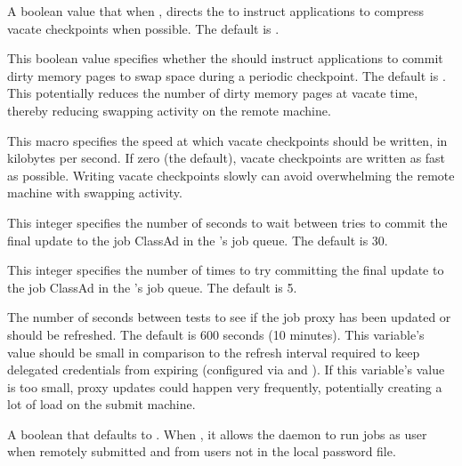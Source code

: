 \begin{description}
\label{param:CompressVacateCkpt}
\item[\Macro{COMPRESS\_VACATE\_CKPT}]
  A boolean value that when , directs the 
  to instruct applications to compress vacate checkpoints when possible.
  The default is .

\label{param:PeriodicMemorySync}
\item[\Macro{PERIODIC\_MEMORY\_SYNC}]
  This boolean value specifies whether the  should instruct
  applications to commit dirty memory pages to swap space during a
  periodic checkpoint.  The default is .  This potentially
  reduces the number of dirty memory pages at vacate time, thereby
  reducing swapping activity on the remote machine.

\label{param:SlowCkptSpeed}
\item[\Macro{SLOW\_CKPT\_SPEED}]
  This macro specifies the speed at which vacate checkpoints should be
  written, in kilobytes per second.  If zero (the default), vacate
  checkpoints are written as fast as possible.  Writing vacate
  checkpoints slowly can avoid overwhelming the remote machine with
  swapping activity.

\label{param:ShadowJobCleanupRetryDelay}
\item[\Macro{SHADOW\_JOB\_CLEANUP\_RETRY\_DELAY}]
  This integer specifies the number of seconds to wait between tries
  to commit the final update to the job ClassAd in the 's
  job queue.  The default is 30.

\label{param:ShadowMaxJobCleanupRetries}
\item[\Macro{SHADOW\_MAX\_JOB\_CLEANUP\_RETRIES}]
  This integer specifies the number of times to try committing
  the final update to the job ClassAd in the 's
  job queue.  The default is 5.

\label{param:ShadowCheckproxyInterval}
\item[\Macro{SHADOW\_CHECKPROXY\_INTERVAL}]
  The number of seconds between tests to see if the job proxy has been
  updated or should be refreshed.  The default is 600 seconds (10 minutes).
  This variable's value should be small in comparison to the refresh interval
  required to keep delegated credentials from expiring 
  (configured via
   and
  ).  
  If this variable's value is too small, 
  proxy updates could happen very frequently, 
  potentially creating a lot of load on the submit machine.

\label{param:ShadowRunUnknownUserJobs}
\item[\Macro{SHADOW\_RUN\_UNKNOWN\_USER\_JOBS}]
  A boolean that defaults to .
  When , it allows the  daemon to run jobs 
  as user  when remotely submitted and from
  users not in the local password file.
\end{description}

